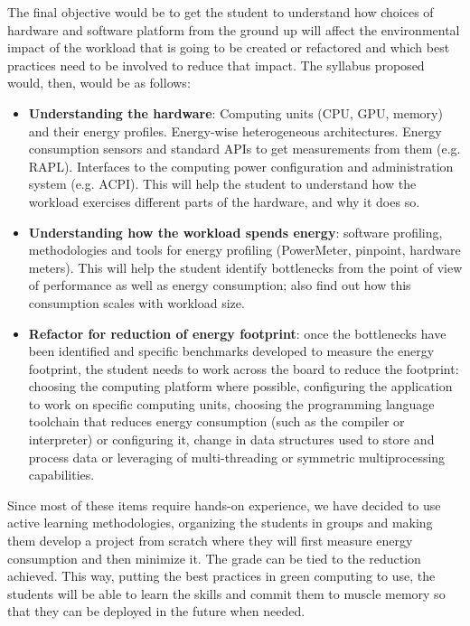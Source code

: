 \documentclass[a4paper]{article}
\begin{document}
The final objective would be to get the student to understand how choices of
hardware and software platform from the ground up will affect the environmental
impact of the workload that is going to be created or refactored and which best
practices need to be involved to reduce that impact. The syllabus proposed
would, then, would be as follows:\begin{itemize}
\item {\bf Understanding the hardware}: Computing units (CPU, GPU, memory) and their energy profiles. Energy-wise
  heterogeneous architectures. Energy consumption sensors and
  standard APIs to get measurements from them (e.g. RAPL). Interfaces to the
  computing power configuration and administration system (e.g. ACPI). This will
  help the student to understand how the workload exercises different parts of
  the hardware, and why it does so.
\item {\bf Understanding how the workload spends energy}: software profiling,
  methodologies and tools for energy profiling (PowerMeter, {\sf pinpoint}, hardware meters). This will help the student identify
  bottlenecks from the point of view of performance as well as energy
  consumption; also find out how this consumption scales with workload size.
\item {\bf Refactor for reduction of energy footprint}: once the bottlenecks
  have been identified and specific benchmarks developed to measure the energy
  footprint, the student needs to work across the board to reduce the footprint:
  choosing the computing platform where possible, configuring the application to
  work on specific computing units, choosing the programming language toolchain
  that reduces energy consumption (such as the compiler or interpreter) or
  configuring it, change
  in data structures used to store and process data or leveraging of
  multi-threading or symmetric multiprocessing capabilities.
\end{itemize}

Since most of these items require hands-on experience, we have decided to use
active learning methodologies, organizing the students in groups and
making them develop a project from scratch where they will first measure energy
consumption and then minimize it. The grade can be tied to the
reduction achieved. This way, putting the best practices in green computing
to use, the students will be able to learn the skills and commit them to muscle
memory so that they can be deployed in the future when needed.



\end{document}
